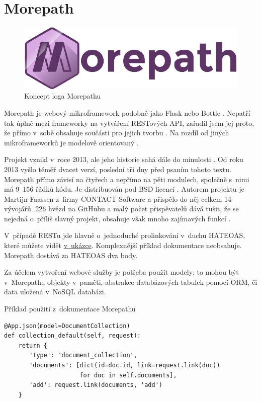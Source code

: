 \section{Morepath}\label{morepath}

\begin{figure}
\centering
\includegraphics{images/morepath}
\caption{Koncept loga Morepathu \autocite{morepathpic}\label{pic:morepath}}
\end{figure}

Morepath je webový mikroframework podobně jako Flask nebo Bottle \autocite{morepath}. Nepatří tak úplně mezi frameworky na vytváření RESTových API, zařadil jsem jej proto, že přímo v~sobě obsahuje součásti pro jejich tvorbu \autocite{morepathrest}. Na rozdíl od jiných mikroframeworků je modelově orientovaný \autocite{morepath}.

Projekt vznikl v~roce 2013, ale jeho historie sahá dále do minulosti \autocite{morepathhistory}. Od roku 2013 vyšlo téměř dvacet verzí, poslední tři dny před psaním tohoto textu. Morepath přímo závisí na čtyřech a nepřímo na pěti modulech, společně s~nimi má 9~156 řádků kódu. Je distribuován pod BSD licencí \autocite{BSD3}. Autorem projektu je Martijn Faassen z~firmy CONTACT Software a přispělo do něj celkem 14 vývojářů. 226 hvězd na GitHubu a malý počet přispěvatelů dává tušit, že se nejedná o~příliš slavný projekt, obsahuje však mnoho zajímavých funkcí \autocite{morepathsp}.

V~případě RESTu jde hlavně o~jednoduché prolinkování v~duchu HATEOAS, které můžete vidět \protect\hyperlink{code:morepath}{v~ukázce}. Komplexnější příklad dokumentace neobsahuje. Morepath dostává za HATEOAS dva body.

Za účelem vytvoření webové služby je potřeba použít modely; to mohou být v~Morepathu objekty v~paměti, abstrakce databázových tabulek pomocí ORM, či data uložená v~NoSQL databázi.

\begin{listing}[htbp]
\caption{{\label{code:morepath}Příklad použití z~dokumentace Morepathu \autocite{morepathrest}}}
\begin{verbatim}
@App.json(model=DocumentCollection)
def collection_default(self, request):
    return {
       'type': 'document_collection',
       'documents': [dict(id=doc.id, link=request.link(doc))
                     for doc in self.documents],
       'add': request.link(documents, 'add')
    }
\end{verbatim}
\end{listing}

